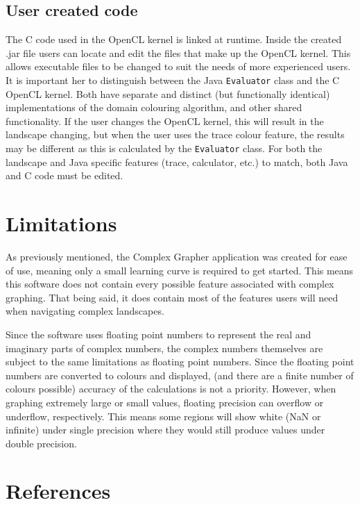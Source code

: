 \documentclass{article}
\begin{document}
			\subsection{User created code}
				The C code used in the OpenCL kernel is linked at runtime. Inside the created .jar file users can locate and edit the files that make up the OpenCL kernel. This allows executable files to be changed to suit the needs of more experienced users. It is important her to distinguish between the Java \lstinline{Evaluator} class and the C OpenCL kernel. Both have separate and distinct (but functionally identical) implementations of the domain colouring algorithm, and other shared functionality. If the user changes the OpenCL kernel, this will result in the landscape changing, but when the user uses the trace colour feature, the results may be different as this is calculated by the \lstinline{Evaluator} class. For both the landscape and Java specific features (trace, calculator, etc.) to match, both Java and C code must be edited.
	
	\section{Limitations}
		As previously mentioned, the Complex Grapher application was created for ease of use, meaning only a small learning curve is required to get started. This means this software does not contain every possible feature associated with complex graphing. That being said, it does contain most of the features users will need when navigating complex landscapes. 
		
		Since the software uses floating point numbers to represent the real and imaginary parts of complex numbers, the complex numbers themselves are subject to the same limitations as floating point numbers. Since the floating point numbers are converted to colours and displayed, (and there are a finite number of colours possible) accuracy of the calculations is not a priority. However, when graphing extremely large or small values, floating precision can overflow or underflow, respectively. This means some regions will show white (NaN or infinite) under single precision where they would still produce values under double precision.
		
		\section{References}
		
\end{document}
